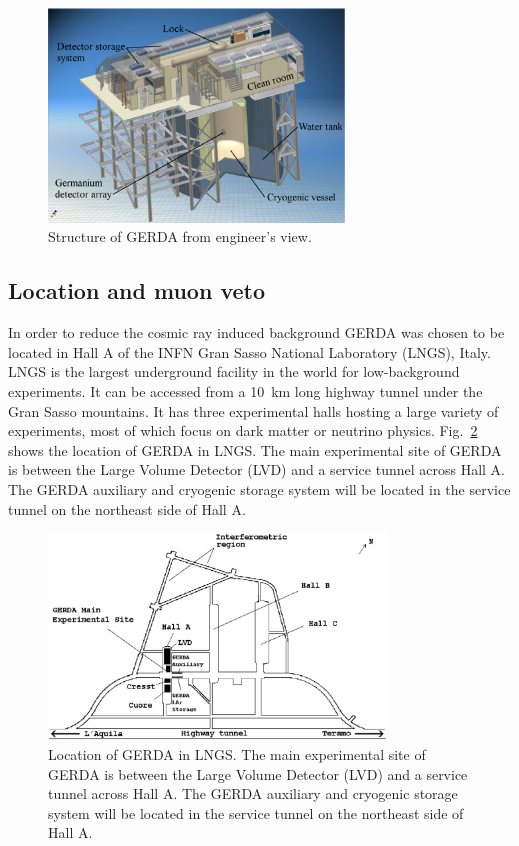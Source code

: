 \begin{figure}[tbhp]
  \centering
  \includegraphics[width=0.7\textwidth]{gerda}  
  \caption{Structure of GERDA from engineer's view.}
  \label{fig:gerda}
\end{figure}

\subsection{Location and muon veto}
\label{sec:gerda:loca}
In order to reduce the cosmic ray induced background GERDA was chosen to be located in Hall A of the INFN Gran Sasso National Laboratory (LNGS), Italy. LNGS is the largest underground facility in the world for low-background experiments. It can be accessed from a 10~km long highway tunnel under the Gran Sasso mountains. It has three experimental halls hosting a large variety of experiments, most of which focus on dark matter or neutrino physics. Fig.~\ref{fig:lngs} shows the location of GERDA in LNGS. The main experimental site of GERDA is between the Large Volume Detector (LVD) and a service tunnel across Hall A. The GERDA auxiliary and cryogenic storage system will be located in the service tunnel on the northeast side of Hall A.

\begin{figure}[tbhp]
  \centering
  \includegraphics[width=0.8\textwidth]{lngs}  
  \caption{Location of GERDA in LNGS. The main experimental site of     GERDA is between the Large Volume Detector (LVD) and a service     tunnel across Hall A. The GERDA auxiliary and cryogenic storage     system will be located in the service tunnel on the northeast side     of Hall A.}
  \label{fig:lngs}
\end{figure}

